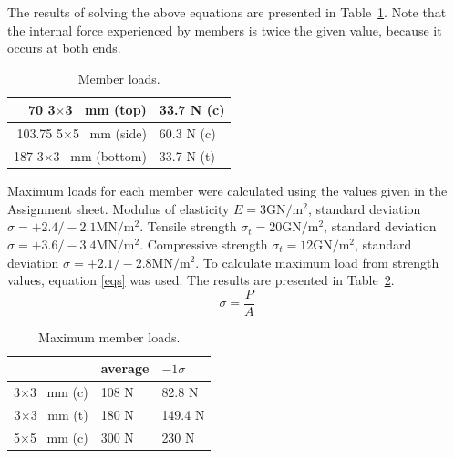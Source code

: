 \documentclass[12pt]{article}
\begin{document}
		The results of solving the above equations are presented in Table~\ref{loads}. Note that the internal force experienced by members is twice the given value, because it occurs at both ends.
		\begin{table}[h!]
			\caption{Member loads.}
			\begin{center}
			\begin{tabular}{ | r | l | }
				\hline
				70 3$\times$3 ~mm (top) & 33.7 N (c) \\ \hline
				103.75 5$\times$5 ~mm (side) & 60.3 N (c) \\ \hline
				187 3$\times$3 ~mm (bottom) & 33.7 N (t) \\ \hline
			\end{tabular}
			\end{center}
			\label{loads}
		\end{table}

		Maximum loads for each member were calculated using the values given in the Assignment sheet. Modulus of elasticity $E=3\mathrm{GN}/\mathrm{m}^2$, standard deviation $\sigma=+2.4/-2.1\mathrm{MN}/\mathrm{m}^2$. Tensile strength $\sigma_t=20\mathrm{GN}/\mathrm{m}^2$,  standard deviation $\sigma=+3.6/-3.4\mathrm{MN}/\mathrm{m}^2$. Compressive strength $\sigma_t=12\mathrm{GN}/\mathrm{m}^2$,  standard deviation $\sigma=+2.1/-2.8\mathrm{MN}/\mathrm{m}^2$. To calculate maximum load from strength values, equation \ref{eqs} was used. The results are presented in Table~\ref{maxloads}.
		\begin{equation}
			\sigma=\frac{P}{A}
			\label{eqs}
		\end{equation}
		\begin{table}[h!]
			\caption{Maximum member loads.}
			\begin{center}
			\begin{tabular}{ | r | l | l | }
				\hline
				& average & $-1\sigma$ \\ \hline
				3$\times$3 ~mm (c) & 108 N & 82.8 N \\ \hline
				3$\times$3 ~mm (t) & 180 N & 149.4 N \\ \hline
				5$\times$5 ~mm (c) & 300 N & 230 N \\ \hline
			\end{tabular}
			\end{center}
			\label{maxloads}
		\end{table}
\end{document}
